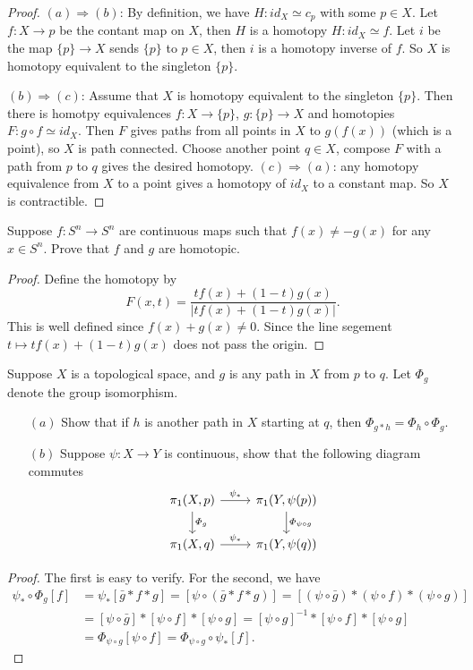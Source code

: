 \begin{proof}
$(a)\Rightarrow(b)$: By definition, we have $H:id_X\simeq c_p$ with some $p\in X$. Let $f:X\to p$ be the contant map on $X$, then $H$ is a homotopy $H:id_X\simeq f$. Let $i$ be the map $\{p\}\to X$ sends $\{p\}$ to $p\in X$, then $i$ is a homotopy inverse of $f$. So $X$ is homotopy equivalent to the singleton $\{p\}$.\par
$(b)\Rightarrow(c)$: Assume that $X$ is homotopy equivalent to the singleton $\{p\}$. Then there is homotpy equivalences $f:X\to\{p\}$, $g:\{p\}\to X$ and homotopies $F:g\circ f\simeq id_X$. Then $F$ gives paths from all points in $X$ to $g(f(x))$ (which is a point), so $X$ is path connected. Choose another point $q\in X$, compose $F$ with a path from $p$ to $q$ gives the desired homotopy.
$(c)\Rightarrow(a)$: any homotopy equivalence from $X$ to a point gives a homotopy of $id_X$ to a constant map. So $X$ is contractible.  
\end{proof}
\begin{exercise}\label{S^n map homotopic}
Suppose $f:S^n\to S^n$ are continuous maps such that $f(x)\neq -g(x)$ for any $x\in S^n$. Prove that $f$ and $g$ are homotopic.
\end{exercise}
\begin{proof}
Define the homotopy by
\[F(x,t)=\dfrac{tf(x)+(1-t)g(x)}{|tf(x)+(1-t)g(x)|}.\]
This is well defined since $f(x)+g(x)\neq 0$. Since the line segement $t\mapsto tf(x)+(1-t)g(x)$ does not pass the origin.
\end{proof}
\begin{exercise}
Suppose $X$ is a topological space, and $g$ is any path in $X$ from $p$ to $q$. Let $\varPhi_g$ denote the group isomorphism. 
\begin{itemize}
\item[$(a)$]Show that if $h$ is another path in $X$ starting at $q$, then $\varPhi_{g\ast h}=\varPhi_h\circ\varPhi_g$.
\item[$(b)$]Suppose $\psi:X\to Y$ is continuous, show that the following diagram commutes
\[\begin{tikzcd}
\pi_1(X,p)\ar[r,"\psi_*"]\ar[d,"\varPhi_g"]&\pi_1(Y,\psi(p))\ar[d,"\varPhi_{\psi\circ g}"]\\
\pi_1(X,q)\ar[r,"\psi_*"]&\pi_1(Y,\psi(q))
\end{tikzcd}\]
\end{itemize}
\end{exercise}
\begin{proof}
The first is easy to verify. For the second, we have
\begin{align*}
\psi_*\circ\varPhi_g[f]&=\psi_*[\bar{g}\ast f\ast g]=[\psi\circ(\bar{g}\ast f\ast g)]=[(\psi\circ\bar{g})\ast(\psi\circ f)\ast(\psi\circ g)]\\
&=[\psi\circ\bar{g}]\ast[\psi\circ f]\ast[\psi\circ g]=[\psi\circ g]^{-1}\ast[\psi\circ f]\ast[\psi\circ g]\\
&=\varPhi_{\psi\circ g}[\psi\circ f]=\varPhi_{\psi\circ g}\circ\psi_*[f].
\end{align*}
\end{proof}

